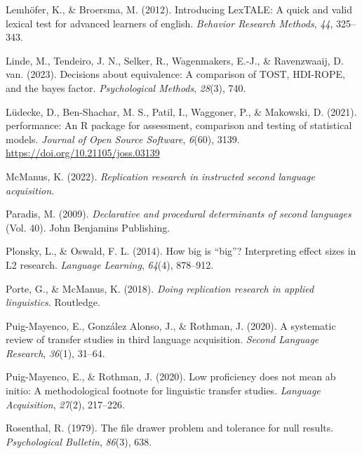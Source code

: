\documentclass[
  man,floatsintext]{apa6}
\newlength{\cslhangindent}
\newlength{\cslentryspacingunit} %
\newenvironment{CSLReferences}[2] %
 {%
  \setlength{\parindent}{0pt}
  \ifodd #1
  \let\oldpar\par
  \def\par{\hangindent=\cslhangindent\oldpar}
  \fi
  \setlength{\parskip}{#2\cslentryspacingunit}
 }%
 {}
\begin{document}
\begin{CSLReferences}{1}{0}
\leavevmode{}%
Lemhöfer, K., \& Broersma, M. (2012). Introducing LexTALE: A quick and valid lexical test for advanced learners of english. \emph{Behavior Research Methods}, \emph{44}, 325--343.

\leavevmode{}%
Linde, M., Tendeiro, J. N., Selker, R., Wagenmakers, E.-J., \& Ravenzwaaij, D. van. (2023). Decisions about equivalence: A comparison of TOST, HDI-ROPE, and the bayes factor. \emph{Psychological Methods}, \emph{28}(3), 740.

\leavevmode{}%
Lüdecke, D., Ben-Shachar, M. S., Patil, I., Waggoner, P., \& Makowski, D. (2021). {performance}: An {R} package for assessment, comparison and testing of statistical models. \emph{Journal of Open Source Software}, \emph{6}(60), 3139. \url{https://doi.org/10.21105/joss.03139}

\leavevmode{}%
McManus, K. (2022). \emph{Replication research in instructed second language acquisition}.

\leavevmode{}%
Paradis, M. (2009). \emph{Declarative and procedural determinants of second languages} (Vol. 40). John Benjamins Publishing.

\leavevmode{}%
Plonsky, L., \& Oswald, F. L. (2014). How big is {``big''}? Interpreting effect sizes in L2 research. \emph{Language Learning}, \emph{64}(4), 878--912.

\leavevmode{}%
Porte, G., \& McManus, K. (2018). \emph{Doing replication research in applied linguistics}. Routledge.

\leavevmode{}%
Puig-Mayenco, E., González Alonso, J., \& Rothman, J. (2020). A systematic review of transfer studies in third language acquisition. \emph{Second Language Research}, \emph{36}(1), 31--64.

\leavevmode{}%
Puig-Mayenco, E., \& Rothman, J. (2020). Low proficiency does not mean ab initio: A methodological footnote for linguistic transfer studies. \emph{Language Acquisition}, \emph{27}(2), 217--226.

\leavevmode{}%
Rosenthal, R. (1979). The file drawer problem and tolerance for null results. \emph{Psychological Bulletin}, \emph{86}(3), 638.


\end{CSLReferences}
\end{document}

